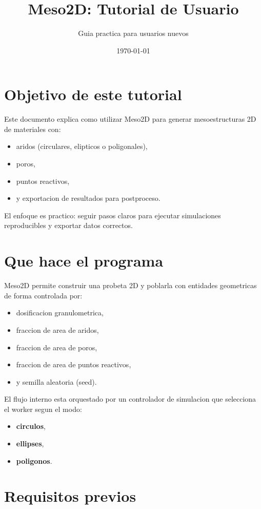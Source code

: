 \documentclass[11pt,a4paper]{article}
\title{Meso2D: Tutorial de Usuario}
\author{Guia practica para usuarios nuevos}
\date{\today}
\begin{document}
\maketitle
\tableofcontents
\newpage

\section{Objetivo de este tutorial}
Este documento explica como utilizar Meso2D para generar mesoestructuras 2D de materiales con:
\begin{itemize}[leftmargin=1.5em]
  \item aridos (circulares, elipticos o poligonales),
  \item poros,
  \item puntos reactivos,
  \item y exportacion de resultados para postproceso.
\end{itemize}

El enfoque es practico: seguir pasos claros para ejecutar simulaciones reproducibles y exportar datos correctos.

\section{Que hace el programa}
Meso2D permite construir una probeta 2D y poblarla con entidades geometricas de forma controlada por:
\begin{itemize}[leftmargin=1.5em]
  \item dosificacion granulometrica,
  \item fraccion de area de aridos,
  \item fraccion de area de poros,
  \item fraccion de area de puntos reactivos,
  \item y semilla aleatoria (seed).
\end{itemize}

El flujo interno esta orquestado por un controlador de simulacion que selecciona el worker segun el modo:
\begin{itemize}[leftmargin=1.5em]
  \item \textbf{circulos},
  \item \textbf{ellipses},
  \item \textbf{poligonos}.
\end{itemize}

\section{Requisitos previos}
\end{document}
